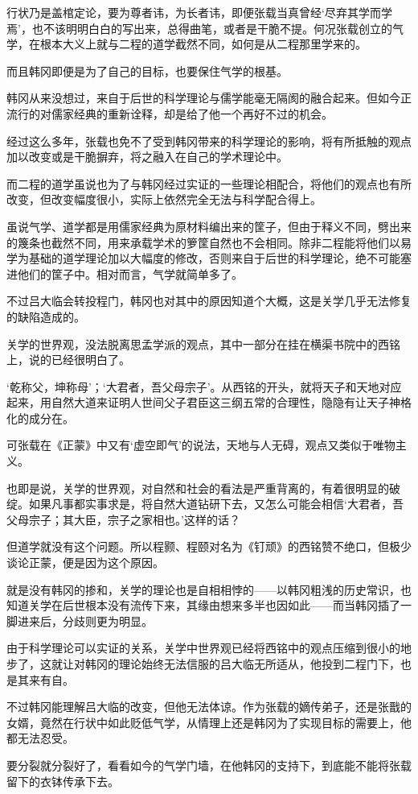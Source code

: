 行状乃是盖棺定论，要为尊者讳，为长者讳，即便张载当真曾经‘尽弃其学而学焉’，也不该明明白白的写出来，总得曲笔，或者是干脆不提。何况张载创立的气学，在根本大义上就与二程的道学截然不同，如何是从二程那里学来的。

而且韩冈即便是为了自己的目标，也要保住气学的根基。

韩冈从来没想过，来自于后世的科学理论与儒学能毫无隔阂的融合起来。但如今正流行的对儒家经典的重新诠释，却是给了他一个再好不过的机会。

经过这么多年，张载也免不了受到韩冈带来的科学理论的影响，将有所抵触的观点加以改变或是干脆摒弃，将之融入在自己的学术理论中。

而二程的道学虽说也为了与韩冈经过实证的一些理论相配合，将他们的观点也有所改变，但改变幅度很小，实际上依然完全无法与科学配合得上。

虽说气学、道学都是用儒家经典为原材料编出来的筐子，但由于释义不同，劈出来的篾条也截然不同，用来承载学术的箩筐自然也不会相同。除非二程能将他们以易学为基础的道学理论加以大幅度的修改，否则来自于后世的科学理论，绝不可能塞进他们的筐子中。相对而言，气学就简单多了。

不过吕大临会转投程门，韩冈也对其中的原因知道个大概，这是关学几乎无法修复的缺陷造成的。

关学的世界观，没法脱离思孟学派的观点，其中一部分在挂在横渠书院中的西铭上，说的已经很明白了。

‘乾称父，坤称母’；‘大君者，吾父母宗子’。从西铭的开头，就将天子和天地对应起来，用自然大道来证明人世间父子君臣这三纲五常的合理性，隐隐有让天子神格化的成分在。

可张载在《正蒙》中又有‘虚空即气’的说法，天地与人无碍，观点又类似于唯物主义。

也即是说，关学的世界观，对自然和社会的看法是严重背离的，有着很明显的破绽。如果凡事都实事求是，将自然大道钻研下去，又怎么可能会相信‘大君者，吾父母宗子；其大臣，宗子之家相也。’这样的话？

但道学就没有这个问题。所以程颢、程颐对名为《钉顽》的西铭赞不绝口，但极少谈论正蒙，便是因为这个原因。

就是没有韩冈的掺和，关学的理论也是自相相悖的——以韩冈粗浅的历史常识，也知道关学在后世根本没有流传下来，其缘由想来多半也因如此——而当韩冈插了一脚进来后，分歧则更为明显。

由于科学理论可以实证的关系，关学中世界观已经将西铭中的观点压缩到很小的地步了，这就让对韩冈的理论始终无法信服的吕大临无所适从，他投到二程门下，也是其来有自。

不过韩冈能理解吕大临的改变，但他无法体谅。作为张载的嫡传弟子，还是张戬的女婿，竟然在行状中如此贬低气学，从情理上还是韩冈为了实现目标的需要上，他都无法忍受。

要分裂就分裂好了，看看如今的气学门墙，在他韩冈的支持下，到底能不能将张载留下的衣钵传承下去。

